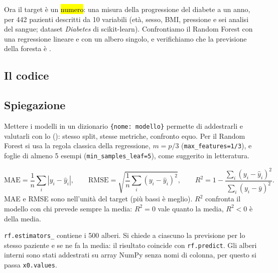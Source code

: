 
\begin{inbreve}
Ora il target è un \hl{numero}: una misura della progressione del diabete a un anno, per 442 pazienti descritti da 10 variabili (età, sesso, BMI, pressione e sei analisi del sangue; dataset \emph{Diabetes} di scikit-learn). Confrontiamo il Random Forest con una regressione lineare e con un albero singolo, e verifichiamo che la previsione della foresta è .
\end{inbreve}

\subsection{Il codice}


\subsection{Spiegazione}

\begin{tecnica}
Mettere i modelli in un dizionario \texttt{\{nome: modello\}} permette di addestrarli e valutarli con lo  (): stesso split, stesse metriche, confronto equo. Per il Random Forest si usa la regola classica della regressione, $m=p/3$ (\texttt{max\_features=1/3}), e foglie di almeno 5 esempi (\texttt{min\_samples\_leaf=5}), come suggerito in letteratura.
\end{tecnica}

\begin{tecnica}
\[
\mathrm{MAE}=\frac1n\sum_i|y_i-\hat y_i|,\qquad
\mathrm{RMSE}=\sqrt{\frac1n\sum_i(y_i-\hat y_i)^2},\qquad
R^2=1-\frac{\sum_i(y_i-\hat y_i)^2}{\sum_i(y_i-\bar y)^2}.
\]
MAE e RMSE sono nell'unità del target (più bassi è meglio). $R^2$ confronta il modello con chi prevede sempre la media: $R^2=0$ vale quanto la media, $R^2<0$ è  della media.
\end{tecnica}

\begin{tecnica}
\texttt{rf.estimators\_} contiene i 500 alberi. Si chiede a ciascuno la previsione per lo stesso paziente e se ne fa la media: il risultato coincide con \texttt{rf.predict}. Gli alberi interni sono stati addestrati su array NumPy senza nomi di colonna, per questo si passa \texttt{x0.values}.
\end{tecnica}


